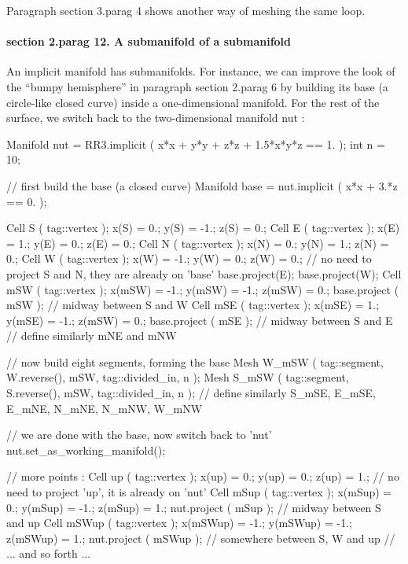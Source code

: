 Paragraph \numb section 3.\numb parag 4 shows another way of meshing the same loop.


\paragraph{\numb section 2.\numb parag 12. A submanifold of a submanifold}

An implicit manifold has submanifolds.
For instance, we can improve the look of the ``bumpy hemisphere'' in paragraph
\numb section 2.\numb parag 6 by building its base (a circle-like closed curve)
inside a one-dimensional manifold.
For the rest of the surface, we switch back to the two-dimensional manifold {\codett nut} :
\medskip

\verbatim
   Manifold nut = RR3.implicit ( x*x + y*y + z*z + 1.5*x*y*z == 1. );
   int n = 10;

   // first build the base (a closed curve) 
   Manifold base = nut.implicit ( x*x + 3.*z == 0. );

   Cell S ( tag::vertex );    x(S)  =   0.;   y(S)  =  -1.;   z(S)  =  0.;
   Cell E ( tag::vertex );    x(E)  =   1.;   y(E)  =   0.;   z(E)  =  0.;
   Cell N ( tag::vertex );    x(N)  =   0.;   y(N)  =   1.;   z(N)  =  0.;
   Cell W ( tag::vertex );    x(W)  =  -1.;   y(W)  =   0.;   z(W)  =  0.;
   // no need to project S and N, they are already on 'base'
   base.project(E);  base.project(W);
   Cell mSW ( tag::vertex );  x(mSW) = -1.;   y(mSW) = -1.;   z(mSW) = 0.;
   base.project ( mSW );  // midway between S and W
   Cell mSE ( tag::vertex );  x(mSE) =  1.;   y(mSE) = -1.;   z(mSW) = 0.;
   base.project ( mSE );  // midway between S and E
   // define similarly mNE and mNW

   // now build eight segments, forming the base
   Mesh W_mSW  ( tag::segment, W.reverse(), mSW, tag::divided_in, n );
   Mesh S_mSW  ( tag::segment, S.reverse(), mSW, tag::divided_in, n );
   // define similarly S_mSE, E_mSE, E_mNE, N_mNE, N_mNW, W_mNW

   // we are done with the base, now switch back to 'nut'
   nut.set_as_working_manifold();

   // more points :
   Cell up ( tag::vertex );   x(up) =   0.;   y(up) =   0.;   z(up) =  1.;
   // no need to project 'up', it is already on 'nut'
   Cell mSup  ( tag::vertex );  x(mSup) =  0.;   y(mSup) = -1.;   z(mSup) = 1.;
   nut.project ( mSup );  // midway between S and up
   Cell mSWup ( tag::vertex );  x(mSWup) = -1.;  y(mSWup) = -1.;  z(mSWup) = 1.;
   nut.project ( mSWup );  // somewhere between S, W and up
   // ... and so forth ...


